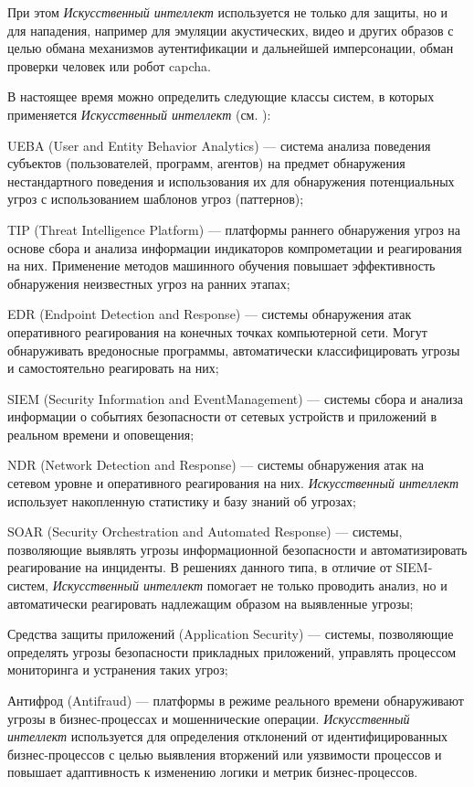 При этом \textit{Искусственный интеллект} используется не только для защиты, но и для нападения, например для эмуляции акустических, видео и других образов с целью обмана механизмов аутентификации и дальнейшей имперсонации, обман проверки человек или робот capcha.

В настоящее время можно определить следующие классы систем, в которых применяется \textit{Искусственный интеллект} (см. ):

\begin{textitemize}
	\item UEBA (User and Entity Behavior Analytics) --- система анализа поведения субъектов (пользователей, программ, агентов) на предмет обнаружения нестандартного поведения и использования их для обнаружения потенциальных угроз с использованием шаблонов угроз (паттернов);
	\item TIP (Threat Intelligence Platform) --- платформы раннего обнаружения угроз на основе сбора и анализа информации индикаторов компрометации и реагирования на них. Применение методов машинного обучения повышает эффективность обнаружения неизвестных угроз на ранних этапах;
	\item EDR (Endpoint Detection and Response) --- системы обнаружения атак оперативного реагирования на конечных точках компьютерной сети. Могут обнаруживать вредоносные программы, автоматически классифицировать угрозы и самостоятельно реагировать на них;
	\item SIEM (Security Information and EventManagement) --- системы сбора и анализа информации о событиях безопасности от сетевых устройств и приложений в реальном времени и оповещения;
	\item NDR (Network Detection and Response) --- системы обнаружения атак на сетевом уровне и оперативного реагирования на них. \textit{Искусственный интеллект} использует накопленную статистику и базу знаний об угрозах;
	\item SOAR (Security Orchestration and Automated Response) --- системы, позволяющие выявлять угрозы информационной безопасности и автоматизировать реагирование на инциденты. В решениях данного типа, в отличие от SIEM-систем, \textit{Искусственный интеллект} помогает не только проводить анализ, но и автоматически реагировать надлежащим образом на выявленные угрозы;
	\item Средства защиты приложений (Application Security) --- системы, позволяющие определять угрозы безопасности прикладных приложений, управлять процессом мониторинга и устранения таких угроз;
	\item Антифрод (Antifraud) --- платформы в режиме реального времени обнаруживают угрозы в бизнес-процессах и мошеннические операции. \textit{Искусственный интеллект} используется для определения отклонений от идентифицированных бизнес-процессов с целью выявления вторжений или уязвимости процессов и повышает адаптивность к изменению логики и метрик бизнес-процессов.
\end{textitemize}


